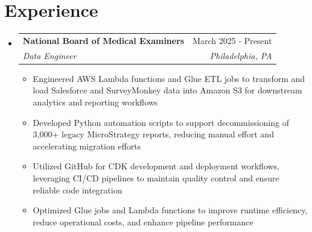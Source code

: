 \documentclass[letterpaper,11pt]{article}
\makeatletter
\newcommand{\resumeItem}[1]{
  \item\small{
    {#1 \vspace{-2pt}}
  }
}
\newcommand{\resumeSubheading}[4]{
  \vspace{-2pt}\item
    \begin{tabular*}{0.97\textwidth}[t]{l@{\extracolsep{\fill}}r}
      \textbf{#1} & #2 \\
      \textit{\small#3} & \textit{\small #4} \\
    \end{tabular*}\vspace{-7pt}
}
\newcommand{\resumeSubHeadingListStart}{\begin{itemize}[leftmargin=0.15in, label={}]}
\newcommand{\resumeSubHeadingListEnd}{\end{itemize}}
\newcommand{\resumeItemListStart}{\begin{itemize}}
\newcommand{\resumeItemListEnd}{\end{itemize}\vspace{-5pt}}
\makeatother
\begin{document}
\section{Experience}
  \resumeSubHeadingListStart
      \resumeSubheading
      {\textbf{National Board of Medical Examiners}}{March 2025 - Present}
      {Data Engineer}{Philadelphia, PA}
      \resumeItemListStart
        \resumeItem{Engineered AWS Lambda functions and Glue ETL jobs to transform and load Salesforce and SurveyMonkey data into Amazon S3 for downstream analytics and reporting workflows}
        \resumeItem{Developed Python automation scripts to support decommissioning of 3,000+ legacy MicroStrategy reports, reducing manual effort and accelerating migration efforts}
        \resumeItem{Utilized GitHub for CDK development and deployment workflows, leveraging CI/CD pipelines to maintain quality control and ensure reliable code integration}
        \resumeItem{Optimized Glue jobs and Lambda functions to improve runtime efficiency, reduce operational costs, and enhance pipeline performance}
      \resumeItemListEnd
  \resumeSubHeadingListEnd
\end{document}
